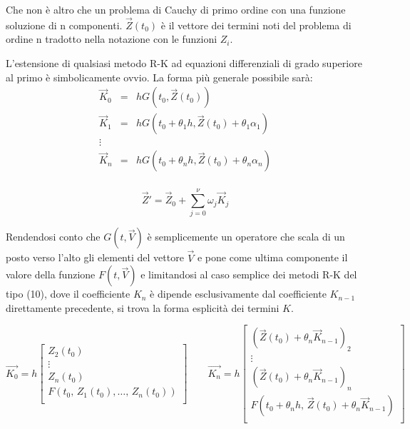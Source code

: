 \documentclass[11pt]{article}
\begin{document}
Che non è altro che un problema di Cauchy di primo ordine con una funzione soluzione di n componenti.
$\vec{Z}(t_{0})$ è il vettore dei termini noti del problema di ordine n tradotto nella notazione con le funzioni $Z_{i}$.

L'estensione di qualsiasi metodo R-K ad equazioni differenziali di grado superiore al primo è simbolicamente ovvio. La forma più generale possibile sarà:
\begin{displaymath}
	\begin{array}{rcl}
				\vec{K}_{0} & = & h G(t_{0} , \vec{Z}(t_{0})) \\
				\vec{K}_{1} & = & h G(t_{0} + \theta_{1} h , \vec{Z}(t_{0}) + \theta_{1} \alpha_{1}) \\
				\vdots \\
				\vec{K}_{n} & = & h G(t_{0} + \theta_{n} h ,\vec{Z}(t_{0}) + \theta_{n} \alpha_{n}) \\
	\end{array}
\end{displaymath}

	\begin{equation}
	\vec{Z}' = \vec{Z}_{0} + \sum_{j=0}^{\nu}\omega_{j}\vec{K}_{j}
	\end{equation}

Rendendosi conto che $G(t, \vec{V})$ è semplicemente un operatore che scala di un posto verso l'alto gli elementi del vettore $\vec{V}$ e pone come ultima componente il valore della funzione $F(t, \vec{V})$ e limitandosi al caso semplice dei metodi R-K del tipo (10), dove il coefficiente $K_{n}$ è dipende esclusivamente dal coefficiente $K_{n-1}$ direttamente precedente, si trova la forma esplicità dei termini $K$.

	\begin{equation}
	\vec{K_{0}} = h \left[ 
				\begin{array}{c}
 				Z_{2}(t_{0}) \\
				\vdots \\
				Z_{n}(t_{0}) \\
 				F(t_{0} , \, Z_{1}(t_{0}) , \ldots ,\, Z_{n}(t_{0}) )  \\
  				\end{array} \right]
\qquad
	\vec{K_{n}} = h \left[ 
				\begin{array}{c}
 				(\vec{Z}(t_{0}) + \theta_{n}\vec{K}_{n-1})_{2} \\
				\vdots \\
				(\vec{Z}(t_{0}) + \theta_{n}\vec{K}_{n-1})_{n}\\
 				F(t_{0} + \theta_{n} h,\, \vec{Z}(t_{0}) + \theta_{n}\vec{K}_{n-1} )  \\
  				\end{array} \right]
	\end{equation} 
\end{document}
